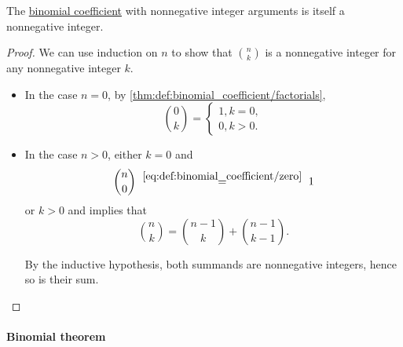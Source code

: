 \begin{corollary}\label{thm:binomial_coefficient_is_integer}
  The \hyperref[def:binomial_coefficient]{binomial coefficient} with nonnegative integer arguments is itself a nonnegative integer.
\end{corollary}
\begin{proof}
  We can use induction on \( n \) to show that \( \binom n k \) is a nonnegative integer for any nonnegative integer \( k \).
  \begin{itemize}
    \item In the case \( n = 0 \), by \cref{thm:def:binomial_coefficient/factorials},
    \begin{equation*}
      \binom 0 k = \begin{cases}
        1, k = 0, \\
        0, k > 0.
      \end{cases}
    \end{equation*}

    \item In the case \( n > 0 \), either \( k = 0 \) and
    \begin{equation*}
      \binom n 0 \reloset {\eqref{eq:def:binomial_coefficient/zero}} = 1
    \end{equation*}
    or \( k > 0 \) and  implies that
    \begin{equation*}
      \binom n k
      =
      \binom {n - 1} k + \binom {n - 1} {k - 1}.
    \end{equation*}

    By the inductive hypothesis, both summands are nonnegative integers, hence so is their sum.
  \end{itemize}
\end{proof}

\paragraph{Binomial theorem}


